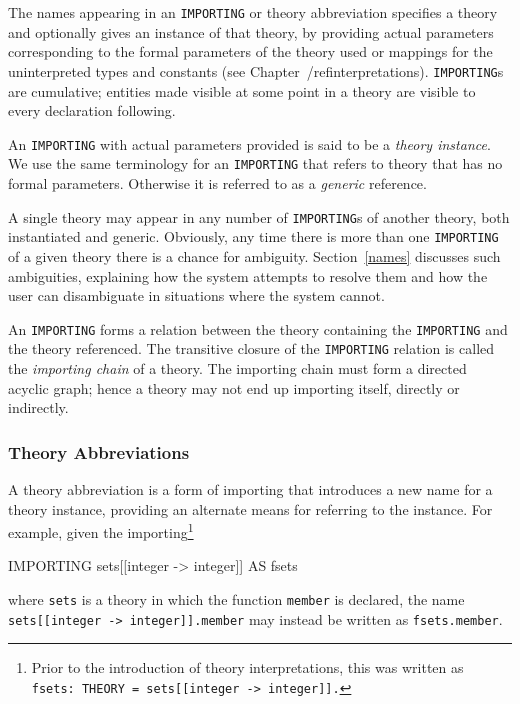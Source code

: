 The names appearing in an \texttt{IMPORTING} or theory abbreviation
specifies a theory and optionally gives an instance of that theory, by
providing actual parameters corresponding to the formal parameters of the
theory used or mappings for the uninterpreted types and constants (see
Chapter~/ref{interpretations}).  \texttt{IMPORTING}s are cumulative;
entities made visible at some point in a theory are visible to every
declaration following.

An \texttt{IMPORTING} with actual parameters provided is said to be a \emph{
theory instance}. We use the same terminology for
an \texttt{IMPORTING} that refers to theory that has no formal parameters.
Otherwise it is referred to as a \emph{generic}
reference.

A single theory may appear in any number of \texttt{IMPORTING}s of another
theory, both instantiated and generic.  Obviously, any time there is
more than one \texttt{IMPORTING} of a given theory there is a chance for
ambiguity.  Section~\ref{names} discusses such ambiguities, explaining
how the system attempts to resolve them and how the user can
disambiguate in situations where the system cannot.

An \texttt{IMPORTING} forms a relation between the theory containing the
\texttt{IMPORTING} and the theory referenced.  The transitive closure of
the \texttt{IMPORTING} relation is called the \emph{importing chain} of a
theory.  The importing chain must form a directed acyclic graph; hence a
theory may not end up importing itself, directly or indirectly.


\subsubsection{Theory Abbreviations}\label{theory-abbreviations}

A theory abbreviation is a form of importing that introduces a new name
for a theory instance, providing an alternate means for referring to the
instance.  For example, given the importing\footnote{Prior to the
introduction of theory interpretations, this was written as
\texttt{fsets:\ THEORY = sets[[integer -> integer]].}}
\begin{pvsex}
  IMPORTING sets[[integer -> integer]] AS fsets
\end{pvsex}
where \texttt{sets} is a theory in which the function \texttt{member} is
declared, the name \texttt{sets[[integer -> integer]].member} may instead
be written as \texttt{fsets.member}.


